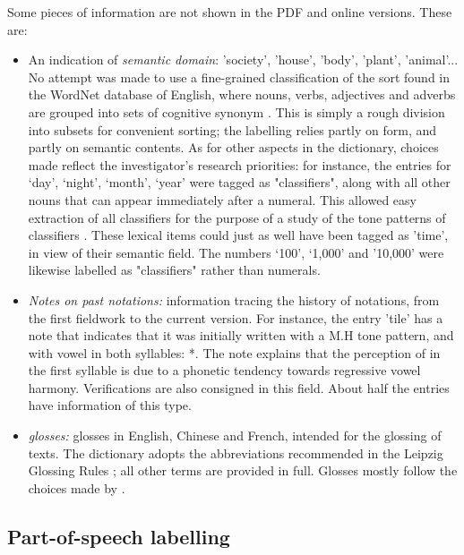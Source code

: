 Some pieces of information are not shown in the PDF and online versions. These are:
\begin{itemize}
	\item An indication of \textit{semantic domain}: 'society', 'house', 'body', 'plant', 'animal'... No attempt was made to use a fine-grained classification of the sort found in the WordNet database of English, where nouns, verbs, adjectives and adverbs are grouped into sets of cognitive synonym \citep{Fellbaum 2005}. This is simply a rough division into subsets for convenient sorting; the labelling relies partly on form, and partly on semantic contents. As for other aspects in the dictionary, choices made reflect the investigator's research priorities: for instance, the entries for ‘day’, ‘night’, ‘month’, ‘year’ were tagged as "classifiers", along with all other nouns that can appear immediately after a numeral. This allowed easy extraction of all classifiers for the purpose of a study of the tone patterns of classifiers \citep{Michaud2013}. These lexical items could just as well have been tagged as 'time', in view of their semantic field. The numbers ‘100’, ‘1,000’ and ’10,000’ were likewise labelled as "classifiers" rather than numerals.
	\item \textit{Notes on past notations:} information tracing the history of notations, from the first fieldwork to the current version. For instance, the entry  'tile' has a note that indicates that it was initially written with a M.H tone pattern, and with vowel  in both syllables: *. The note explains that the perception of  in the first syllable is due to a phonetic tendency towards regressive vowel harmony. Verifications are also consigned in this field. About half the entries have information of this type.
	\item \textit{glosses:} glosses in English, Chinese and French, intended for the glossing of texts. The dictionary adopts the abbreviations recommended in the Leipzig Glossing Rules \citep{Comrie}; all other terms are provided in full. Glosses mostly follow the choices made by \citep{Lidz2010}.
\end{itemize}

	\subsection{Part-of-speech labelling} \label{sec:pos}
	
